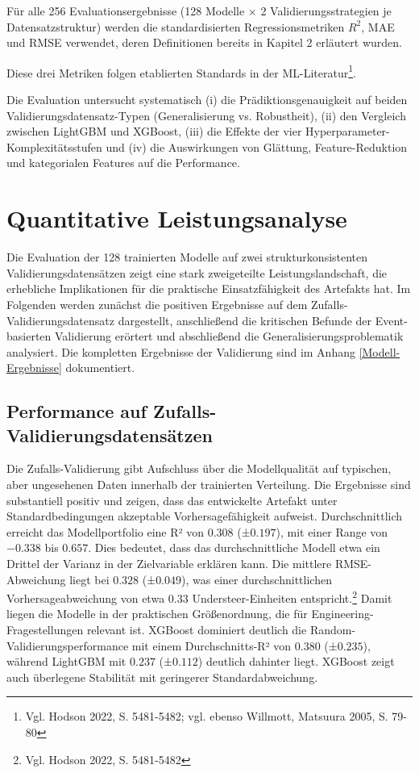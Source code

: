 Für alle 256 Evaluationsergebnisse (128 Modelle × 2 Validierungsstrategien je Datensatzstruktur) werden die standardisierten Regressionsmetriken $R^2$, MAE und RMSE verwendet, deren Definitionen bereits in Kapitel 2 erläutert wurden.

Diese drei Metriken folgen etablierten Standards in der \ac{ML}-Literatur\footnote{Vgl. Hodson 2022, S. 5481-5482; vgl. ebenso Willmott, Matsuura 2005, S. 79-80}.

Die Evaluation untersucht systematisch (i) die Prädiktionsgenauigkeit auf beiden Validierungsdatensatz-Typen (Generalisierung vs. Robustheit), (ii) den Vergleich zwischen LightGBM und XGBoost, (iii) die Effekte der vier Hyperparameter-Komplexitätsstufen und (iv) die Auswirkungen von Glättung, Feature-Reduktion und kategorialen Features auf die Performance.


\section{Quantitative Leistungsanalyse}

Die Evaluation der 128 trainierten Modelle auf zwei strukturkonsistenten Validierungsdatensätzen zeigt eine stark zweigeteilte Leistungslandschaft, die erhebliche Implikationen für die praktische Einsatzfähigkeit des Artefakts hat. Im Folgenden werden zunächst die positiven Ergebnisse auf dem Zufalls-Validierungsdatensatz dargestellt, anschließend die kritischen Befunde der Event-basierten Validierung erörtert und abschließend die Generalisierungsproblematik analysiert.
Die kompletten Ergebnisse der Validierung sind im Anhang \ref{Modell-Ergebnisse} dokumentiert.

\subsection{Performance auf Zufalls-Validierungsdatensätzen}

Die Zufalls-Validierung gibt Aufschluss über die Modellqualität auf typischen, aber ungesehenen Daten innerhalb der trainierten Verteilung. Die Ergebnisse sind substantiell positiv und zeigen, dass das entwickelte Artefakt unter Standardbedingungen akzeptable Vorhersagefähigkeit aufweist.
Durchschnittlich erreicht das Modellportfolio eine R² von $0.308$ (±$0.197$), mit einer Range von $-0.338$ bis $0.657$. Dies bedeutet, dass das durchschnittliche Modell etwa ein Drittel der Varianz in der Zielvariable erklären kann. Die mittlere RMSE-Abweichung liegt bei $0.328$ (±$0.049$), was einer durchschnittlichen Vorhersageabweichung von etwa $0.33$ Understeer-Einheiten entspricht.\footnote{Vgl. Hodson 2022, S. 5481-5482} Damit liegen die Modelle in der praktischen Größenordnung, die für Engineering-Fragestellungen relevant ist. XGBoost dominiert deutlich die Random-Validierungsperformance mit einem Durchschnitts-R² von $0.380$ (±$0.235$), während LightGBM mit $0.237$ (±$0.112$) deutlich dahinter liegt. XGBoost zeigt auch überlegene Stabilität mit geringerer Standardabweichung.


